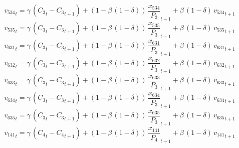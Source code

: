 \begin{dmath}
{{v_{534}}}_{t}={{\gamma}}\, \left({{C_{3}}}_{t}-{{C_{3}}}_{t+1}\right)+\left(1-{{\beta}}\, \left(1-{{\delta}}\right)\right)\, {{\frac{x_{534}}{P_{3}}}}_{t+1}+{{\beta}}\, \left(1-{{\delta}}\right)\, {{v_{534}}}_{t+1}
\end{dmath}
\begin{dmath}
{{v_{535}}}_{t}={{\gamma}}\, \left({{C_{3}}}_{t}-{{C_{3}}}_{t+1}\right)+\left(1-{{\beta}}\, \left(1-{{\delta}}\right)\right)\, {{\frac{x_{535}}{P_{3}}}}_{t+1}+{{\beta}}\, \left(1-{{\delta}}\right)\, {{v_{535}}}_{t+1}
\end{dmath}
\begin{dmath}
{{v_{631}}}_{t}={{\gamma}}\, \left({{C_{3}}}_{t}-{{C_{3}}}_{t+1}\right)+\left(1-{{\beta}}\, \left(1-{{\delta}}\right)\right)\, {{\frac{x_{631}}{P_{3}}}}_{t+1}+{{\beta}}\, \left(1-{{\delta}}\right)\, {{v_{631}}}_{t+1}
\end{dmath}
\begin{dmath}
{{v_{632}}}_{t}={{\gamma}}\, \left({{C_{3}}}_{t}-{{C_{3}}}_{t+1}\right)+\left(1-{{\beta}}\, \left(1-{{\delta}}\right)\right)\, {{\frac{x_{632}}{P_{3}}}}_{t+1}+{{\beta}}\, \left(1-{{\delta}}\right)\, {{v_{632}}}_{t+1}
\end{dmath}
\begin{dmath}
{{v_{633}}}_{t}={{\gamma}}\, \left({{C_{3}}}_{t}-{{C_{3}}}_{t+1}\right)+\left(1-{{\beta}}\, \left(1-{{\delta}}\right)\right)\, {{\frac{x_{633}}{P_{3}}}}_{t+1}+{{\beta}}\, \left(1-{{\delta}}\right)\, {{v_{633}}}_{t+1}
\end{dmath}
\begin{dmath}
{{v_{634}}}_{t}={{\gamma}}\, \left({{C_{3}}}_{t}-{{C_{3}}}_{t+1}\right)+\left(1-{{\beta}}\, \left(1-{{\delta}}\right)\right)\, {{\frac{x_{634}}{P_{3}}}}_{t+1}+{{\beta}}\, \left(1-{{\delta}}\right)\, {{v_{634}}}_{t+1}
\end{dmath}
\begin{dmath}
{{v_{635}}}_{t}={{\gamma}}\, \left({{C_{3}}}_{t}-{{C_{3}}}_{t+1}\right)+\left(1-{{\beta}}\, \left(1-{{\delta}}\right)\right)\, {{\frac{x_{635}}{P_{3}}}}_{t+1}+{{\beta}}\, \left(1-{{\delta}}\right)\, {{v_{635}}}_{t+1}
\end{dmath}
\begin{dmath}
{{v_{141}}}_{t}={{\gamma}}\, \left({{C_{4}}}_{t}-{{C_{4}}}_{t+1}\right)+\left(1-{{\beta}}\, \left(1-{{\delta}}\right)\right)\, {{\frac{x_{141}}{P_{4}}}}_{t+1}+{{\beta}}\, \left(1-{{\delta}}\right)\, {{v_{141}}}_{t+1}
\end{dmath}
